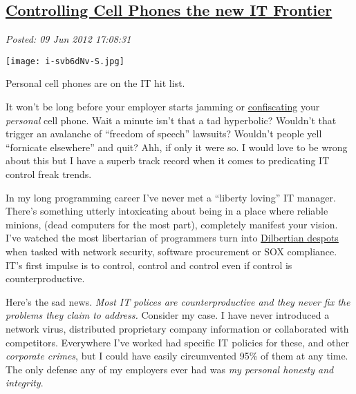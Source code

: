 %

\subsection*{\href{http://bakerjd99.wordpress.com/2012/06/09/controlling-cell-phones-the-new-it-frontier/}{Controlling Cell Phones the new IT Frontier}}


\noindent\emph{Posted: 09 Jun 2012 17:08:31}
\vspace{6pt}



\captionsetup[floatingfigure]{labelformat=empty}
\begin{floatingfigure}[l]{0.25\textwidth}
\centering
\texttt{[image: i-svb6dNv-S.jpg]}
\caption{Personal cell phones are on the IT hit list.}
\label{fig:2934X0}
\end{floatingfigure} It won't be long before your employer starts jamming or
\href{http://newsfeed.time.com/2012/05/15/obama-campaign-bans-cell-phones-at-private-fundraisers/}{confiscating}
your \emph{personal} cell phone. Wait a minute isn't that a tad
hyperbolic? Wouldn't that trigger an avalanche of ``freedom of speech''
lawsuits? Wouldn't people yell ``fornicate elsewhere'' and quit? Ahh, if
only it were so. I would love to be wrong about this but I have a superb
track record when it comes to predicating IT control freak trends.

In my long programming career I've never met a ``liberty loving'' IT
manager. There's something utterly intoxicating about being in a place
where reliable minions, (dead computers for the most part), completely
manifest your vision. I've watched the most libertarian of programmers
turn into \href{http://dilbert.com/strips/comic/2010-09-13/}{Dilbertian
despots} when tasked with network security, software procurement or SOX
compliance. IT's first impulse is to control, control and control even
if control is counterproductive.

Here's the sad news. \emph{Most IT polices are counterproductive and
they never fix the problems they claim to address.} Consider my case. I
have never introduced a network virus, distributed proprietary company
information or collaborated with competitors. Everywhere I've worked had
specific IT policies for these, and other \emph{corporate crimes}, but I
could have easily circumvented 95\% of them at any time. The only
defense any of my employers ever had was \emph{my personal honesty and
integrity}.

